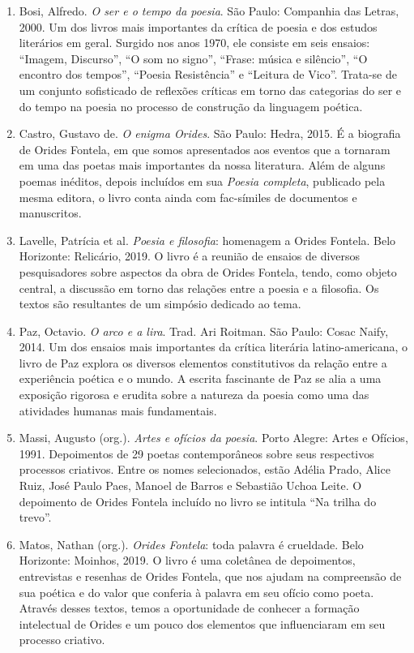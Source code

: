 \documentclass[12pt]{extarticle}
\begin{document}
\begin{enumerate}
\item
  Bosi, Alfredo. \emph{O ser e o tempo da poesia}. São Paulo: Companhia
  das Letras, 2000. Um dos livros mais importantes da crítica de poesia
  e dos estudos literários em geral. Surgido nos anos 1970, ele consiste
  em seis ensaios: ``Imagem, Discurso'', ``O som no signo'', ``Frase:
  música e silêncio'', ``O encontro dos tempos'', ``Poesia Resistência''
  e ``Leitura de Vico''. Trata-se de um conjunto sofisticado de
  reflexões críticas em torno das categorias do ser e do tempo na poesia
  no processo de construção da linguagem poética.
\item
  Castro, Gustavo de. \emph{O enigma Orides}. São Paulo: Hedra, 2015. É
  a biografia de Orides Fontela, em que somos apresentados aos eventos
  que a tornaram em uma das poetas mais importantes da nossa literatura.
  Além de alguns poemas inéditos, depois incluídos em sua \emph{Poesia
  completa}, publicado pela mesma editora, o livro conta ainda com
  fac-símiles de documentos e manuscritos.
\item
  Lavelle, Patrícia et al. \emph{Poesia e filosofia}: homenagem a Orides
  Fontela. Belo Horizonte: Relicário, 2019. O livro é a reunião de
  ensaios de diversos pesquisadores sobre aspectos da obra de Orides
  Fontela, tendo, como objeto central, a discussão em torno das relações
  entre a poesia e a filosofia. Os textos são resultantes de um simpósio
  dedicado ao tema.
\item
  Paz, Octavio. \emph{O arco e a lira}. Trad. Ari Roitman. São Paulo:
  Cosac Naify, 2014. Um dos ensaios mais importantes da crítica
  literária latino-americana, o livro de Paz explora os diversos
  elementos constitutivos da relação entre a experiência poética e o
  mundo. A escrita fascinante de Paz se alia a uma exposição rigorosa e
  erudita sobre a natureza da poesia como uma das atividades humanas
  mais fundamentais.
\item
  Massi, Augusto (org.). \emph{Artes e ofícios da poesia}. Porto Alegre:
  Artes e Ofícios, 1991. Depoimentos de 29 poetas contemporâneos sobre
  seus respectivos processos criativos. Entre os nomes selecionados,
  estão Adélia Prado, Alice Ruiz, José Paulo Paes, Manoel de Barros e
  Sebastião Uchoa Leite. O depoimento de Orides Fontela incluído no
  livro se intitula ``Na trilha do trevo''.
\item
  Matos, Nathan (org.). \emph{Orides Fontela}: toda palavra é crueldade.
  Belo Horizonte: Moinhos, 2019. O livro é uma coletânea de depoimentos,
  entrevistas e resenhas de Orides Fontela, que nos ajudam na
  compreensão de sua poética e do valor que conferia à palavra em seu
  ofício como poeta. Através desses textos, temos a oportunidade de
  conhecer a formação intelectual de Orides e um pouco dos elementos que
  influenciaram em seu processo criativo.
\end{enumerate}
\end{document}

